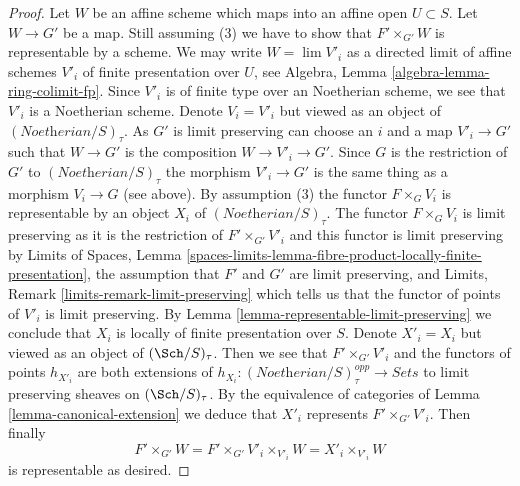 \begin{proof}
\medskip\noindent
Let $W$ be an affine scheme which maps into an affine open $U \subset S$.
Let $W \to G'$ be a map.
Still assuming (3) we have to show that $F' \times_{G'} W$
is representable by a scheme.
We may write $W = \lim V'_i$ as a directed limit of affine
schemes $V'_i$ of finite presentation over $U$, see
Algebra, Lemma \ref{algebra-lemma-ring-colimit-fp}.
Since $V'_i$ is of finite type over an Noetherian scheme,
we see that $V'_i$ is a Noetherian scheme.
Denote $V_i = V'_i$ but viewed as an object of
$(\textit{Noetherian}/S)_\tau$. As $G'$
is limit preserving can choose an $i$ and a map
$V'_i \to G'$ such that $W \to G'$ is the composition
$W \to V'_i \to G'$. Since $G$ is the restriction of $G'$
to $(\textit{Noetherian}/S)_\tau$ the morphism $V'_i \to G'$
is the same thing as a morphism $V_i \to G$ (see above).
By assumption (3) the functor $F \times_G V_i$ is representable by an object
$X_i$ of $(\textit{Noetherian}/S)_\tau$.
The functor $F \times_G V_i$ is limit preserving
as it is the restriction of $F' \times_{G'} V'_i$
and this functor is limit preserving by
Limits of Spaces, Lemma
\ref{spaces-limits-lemma-fibre-product-locally-finite-presentation},
the assumption that $F'$ and $G'$ are limit preserving, and
Limits, Remark \ref{limits-remark-limit-preserving} which
tells us that the functor of points of $V'_i$ is limit preserving.
By Lemma \ref{lemma-representable-limit-preserving}
we conclude that $X_i$ is locally of finite presentation over $S$.
Denote $X'_i = X_i$ but viewed as an object of
$(\Sch/S)_\tau$. Then we see that $F' \times_{G'} V'_i$
and the functors of points $h_{X'_i}$ are both extensions
of $h_{X_i} : (\textit{Noetherian}/S)_\tau^{opp} \to \textit{Sets}$
to limit preserving sheaves on $(\Sch/S)_\tau$.
By the equivalence of categories of Lemma \ref{lemma-canonical-extension}
we deduce that $X'_i$ represents $F' \times_{G'} V'_i$.
Then finally
$$
F' \times_{G'} W = F' \times_{G'} V'_i \times_{V'_i} W =
X'_i \times_{V'_i} W
$$
is representable as desired.
\end{proof}

